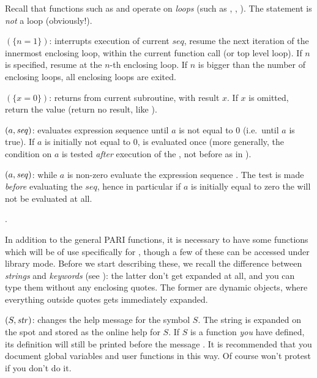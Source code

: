   Recall that functions such as  and  operate on
\emph{loops} (such as , , ). The 
statement is \emph{not} a loop (obviously!).

$(\{n=1\})$: interrupts execution of current $seq$,
resume the next iteration of the innermost enclosing loop, within the
current function call (or top level loop). If $n$ is specified, resume at
the $n$-th enclosing loop. If $n$ is bigger than the number of enclosing
loops, all enclosing loops are exited.

$(\{x=0\})$: returns from current subroutine, with
result $x$. If $x$ is omitted, return the  value (return no
result, like ).

$(a,\hbox{\it seq\/})$: evaluates expression sequence 
until $a$ is not equal to 0 (i.e.~until $a$ is true). If $a$ is initially
not equal to 0,  is evaluated once (more generally, the condition
on $a$ is tested \emph{after} execution of the , not before as in
).

$(a,\hbox{\it seq\/})$: while $a$ is non-zero evaluate the
expression sequence . The test is made \emph{before} evaluating
the $seq$, hence in particular if $a$ is initially equal to zero the
 will not be evaluated at all.\smallskip

.
\label{se:gp_program}

  In addition to the general PARI functions, it is necessary to have some
functions which will be of use specifically for , though a few of these can
be accessed under library mode. Before we start describing these, we recall
the difference between \emph{strings} and \emph{keywords} (see
): the latter don't get expanded at all, and you can type
them without any enclosing quotes. The former are dynamic objects, where
everything outside quotes gets immediately expanded.

$(S,\hbox{\it str\/})$:\label{se:addhelp} changes the help
message for the symbol $S$. The string  is expanded on the spot
and stored as the online help for $S$. If $S$ is a function \emph{you} have
defined, its definition will still be printed before the message .
It is recommended that you document global variables and user functions in
this way. Of course  won't protest if you don't do it.

